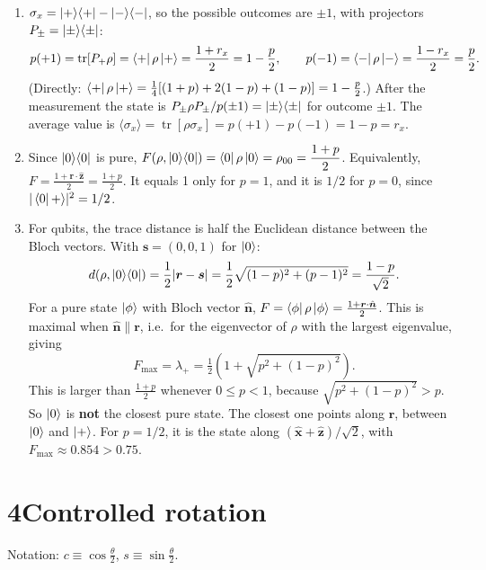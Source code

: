 \documentclass[11pt,a4paper]{article}
\newcommand{\tr}{\operatorname{tr}}
\begin{document}
\begin{enumerate}
\item $\sigma_x=\ket+\!\bra+-\ket-\!\bra-$, so the possible outcomes are $\pm1$, with projectors
$P_\pm=\ket\pm\!\bra\pm$:
\[
p(+1)=\tr[P_+\rho]=\bra+\rho\ket+=\frac{1+r_x}{2}=1-\frac p2,\qquad
p(-1)=\bra-\rho\ket-=\frac{1-r_x}{2}=\frac p2 .
\]
(Directly: $\bra+\rho\ket+=\frac14[(1+p)+2(1-p)+(1-p)]=1-\frac p2$.) After the measurement the state
is $P_\pm\rho P_\pm/p(\pm1)=\ket\pm\!\bra\pm$ for outcome $\pm1$. The average value is
$\langle\sigma_x\rangle=\tr[\rho\sigma_x]=p(+1)-p(-1)=1-p=r_x$.

\item Since $\ket0\!\bra0$ is pure, $F(\rho,\ket0\!\bra0)=\bra0\rho\ket0=\rho_{00}=\dfrac{1+p}{2}$.
Equivalently, $F=\frac{1+\bm r\cdot\hat{\bm z}}{2}=\frac{1+p}{2}$. It equals 1 only for $p=1$, and it is $1/2$ for
$p=0$, since $|\bra0+\rangle|^2=1/2$.

\item For qubits, the trace distance is half the Euclidean distance between the Bloch vectors.
With $\bm s=(0,0,1)$ for $\ket0$:
\[
d(\rho,\ket0\!\bra0)=\frac12|\bm r-\bm s|=\frac12\sqrt{(1-p)^2+(p-1)^2}=\frac{1-p}{\sqrt2}.
\]
For a pure state $\ket\phi$ with Bloch vector $\hat{\bm n}$, $F=\bra\phi\rho\ket\phi=\frac{1+\bm r\cdot\hat{\bm n}}{2}$.
This is maximal when $\hat{\bm n}\parallel\bm r$, i.e.\ for the eigenvector of $\rho$ with the
largest eigenvalue, giving
\[
F_{\max}=\lambda_+=\tfrac12\left(1+\sqrt{p^2+(1-p)^2}\right).
\]
This is
larger than $\frac{1+p}{2}$ whenever $0\le p<1$, because $\sqrt{p^2+(1-p)^2}>p$. So $\ket0$ is
\textbf{not} the closest pure state. The closest one points along $\bm r$, between $\ket0$ and
$\ket+$. For $p=1/2$, it is the state along $(\hat{\bm x}+\hat{\bm z})/\sqrt2$, with
$F_{\max}\approx0.854>0.75$.
\end{enumerate}

\section*{4\quad Controlled rotation}

Notation: $c\equiv\cos\frac\theta2$, $s\equiv\sin\frac\theta2$.
\end{document}
